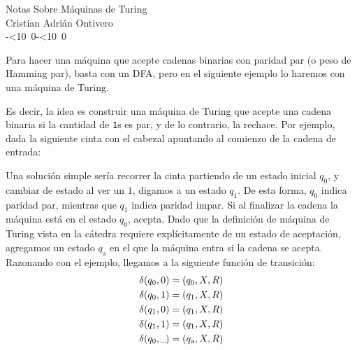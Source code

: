 \documentclass{article}
\theoremstyle{definition}
\def\isodate{\leavevmode\hbox{\the\year-\twodigits\month-\twodigits\day}}
\def\twodigits#1{\ifnum#1<10 0\fi\the#1}
\begin{document}
\begin{center}
  {\LARGE Notas Sobre Máquinas de Turing}\\[.2cm]
  Cristian Adrián Ontivero \\[.05cm]%
  \isodate
\end{center}

Para hacer una máquina que acepte cadenas binarias con paridad par (o peso de
Hamming par), basta con un DFA, pero en el siguiente ejemplo lo haremos con una
máquina de Turing.

Es decir, la idea es construir una máquina de Turing que acepte una cadena
binaria si la cantidad de {\tt 1}s es par, y de lo contrario, la rechace. Por
ejemplo, dada la siguiente cinta con el cabezal apuntando al comienzo de la cadena de entrada:

\begin{center}
\end{center}
Una solución simple sería recorrer la cinta partiendo de un estado inicial
$q_0$, y cambiar de estado al ver un $1$, digamos a un estado $q_1$. De esta
forma, $q_0$ indica paridad par, mientras que $q_1$ indica paridad impar. Si al
finalizar la cadena la máquina está en el estado $q_0$, acepta. Dado que la
definición de máquina de Turing vista en la cátedra requiere explícitamente de
un estado de aceptación, agregamos un estado $q_{\text{a}}$ en el que la
máquina entra si la cadena se acepta. Razonando con el ejemplo, llegamos a la
siguiente función de transición:
 \begin{align*}
   \delta(q_0, 0) &= (q_0, X, R) \\
   \delta(q_0, 1) &= (q_1, X, R) \\
   \delta(q_1, 0) &= (q_1, X, R) \\
   \delta(q_1, 1) &= (q_1, X, R) \\
   \delta(q_0, \text{\textvisiblespace}) &= (q_{\text{a}}, X, R)
 \end{align*}
\end{document}
